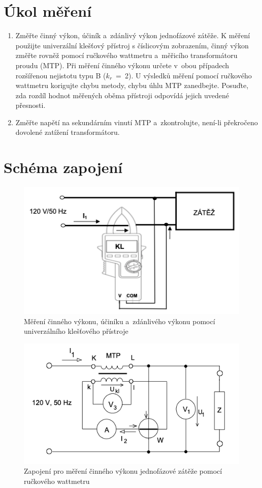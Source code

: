 \documentclass[a4paper,12pt]{article}   %
\begin{document}
\section{Úkol měření}
\label{chap:zadani}
\begin{enumerate}
  \item  Změřte činný výkon, účiník a~zdánlivý výkon jednofázové zátěže. K měření použijte univerzální klešťový přístroj s číslicovým zobrazením, činný výkon změřte rovněž pomocí ručkového wattmetru a~měřicího transformátoru proudu (MTP). Při měření činného výkonu určete v~obou případech rozšířenou nejistotu typu B ($k_r$~=~2). U výsledků měření pomocí ručkového wattmetru korigujte chybu metody, chybu úhlu MTP zanedbejte. Posuďte, zda rozdíl hodnot měřených oběma přístroji odpovídá jejich uvedené přesnosti.
  \item  Změřte napětí na sekundárním vinutí MTP a~zkontrolujte, není-li překročeno dovolené zatížení transformátoru.
\end{enumerate}



\section{Schéma zapojení}
\label{schema_zapojeni}
\begin{figure}[h!]
  \centering
  \includegraphics[width=.6\textwidth]{kestewatt.png}
  \caption{Měření činného výkonu, účiníku a~zdánlivého výkonu pomocí univerzálního klešťového přístroje}
  \label{fig:klestewatt}
\end{figure}

\begin{figure}[h!]
  \centering
  \includegraphics[width=.6\textwidth]{rucwatt.png}
  \caption{Zapojení pro měření činného výkonu jednofázové zátěže pomocí ručkového wattmetru}
  \label{fig:rucwatt}
\end{figure}
\end{document}
